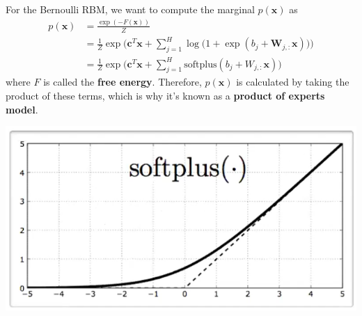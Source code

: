 \documentclass{article}
\begin{document}
      \begin{lemma} 
        For the Bernoulli RBM, we want to compute the marginal $p(\mathbf{x})$ as
        \begin{align*} 
        p(\mathbf{x}) & = \frac{\exp(-F(\mathbf{x}))}{Z} \\
                      & = \frac{1}{Z} \exp \bigg( \mathbf{c}^T \mathbf{x} + \sum_{j=1}^H \log \big( 1 + \exp (b_j + \mathbf{W}_{j, :} \mathbf{x}) \big) \bigg) \\
                      & = \frac{1}{Z} \exp \bigg( \mathbf{c}^T \mathbf{x} + \sum_{j=1}^H \mathrm{softplus}(b_j + W_{j, :} \mathbf{x} ) \bigg)
        \end{align*}
        where $F$ is called the \textbf{free energy}. Therefore, $p(\mathbf{x})$ is calculated by taking the product of these terms, which is why it's known as a \textbf{product of experts model}. 
        \begin{center}
        \includegraphics[scale=0.4]{img/07_Boltzmann/softplus.png} 
        \end{center}
      \end{lemma}
\end{document}
